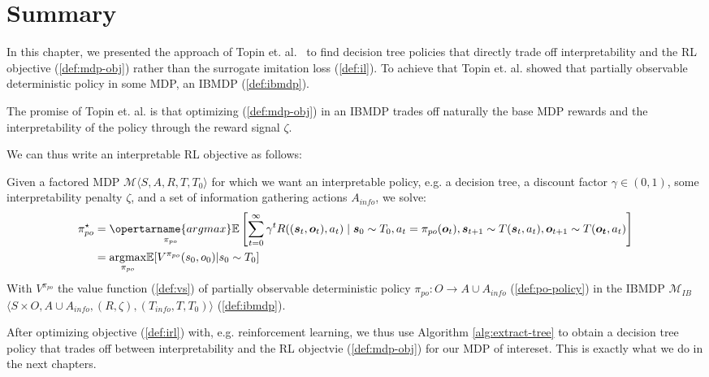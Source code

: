 \section{Summary}
In this chapter, we presented the approach of Topin et. al.~\cite{topin2021iterative} to find decision tree policies that directly trade off interpretability and the RL objective (\ref{def:mdp-obj}) rather than the surrogate imitation loss (\ref{def:il}).
To achieve that Topin et. al. showed that partially observable deterministic policy in some MDP, an IBMDP (\ref{def:ibmdp}).

The promise of Topin et. al. is that optimizing (\ref{def:mdp-obj}) in an IBMDP trades off naturally the base MDP rewards and the interpretability of the policy through the reward signal $\zeta$.

We can thus write an interpretable RL objective as follows:
\begin{definition}\label{def:irl}
    Given a factored MDP $\mathcal{M} \langle S, A, R, T, T_0 \rangle$ for which we want an interpretable policy, e.g. a decision tree, a discount factor $\gamma \in (0,1)$, some interpretability penalty $\zeta$, and a set of information gathering actions $A_{info}$, we solve:
\begin{align*}
    \pi^\star_{po} &= \underset{\pi_{po}}{\opertarname{argmax}} \mathbb{E}\left[\sum_{t=0}^{\infty} \gamma^t R((\boldsymbol{s}_t, \boldsymbol{o}_t), a_t) \mid \boldsymbol{s}_0 \sim T_0, a_t = \pi_{po}(\boldsymbol{o}_t), \boldsymbol{s}_{t+1} \sim T(\boldsymbol{s}_t, a_t), \boldsymbol{o}_{t+1}\sim T(\boldsymbol{o_t}, a_t)\right]\\
    &= \underset{\pi_{po}}{\operatorname{argmax}} \mathbb{E}[V^{\pi_{po}}(s_0, o_0)| s_0\sim T_0]
\end{align*}
With $V^{\pi_{po}}$ the value function (\ref{def:vs}) of partially observable deterministic policy $\pi_{po}: O \rightarrow A\cup A_{info}$ (\ref{def:po-policy}) in the IBMDP $\mathcal{M}_{IB}$ $\langle S \times O,A \cup A_{info}, (R, \zeta), (T_{info}, T, T_0)\rangle$ (\ref{def:ibmdp}).
\end{definition}

After optimizing objective (\ref{def:irl}) with, e.g. reinforcement learning, we thus use Algorithm \ref{alg:extract-tree} to obtain a decision tree policy that trades off between interpretability and the RL objectvie (\ref{def:mdp-obj}) for our MDP of intereset.
This is exactly what we do in the next chapters.
        
